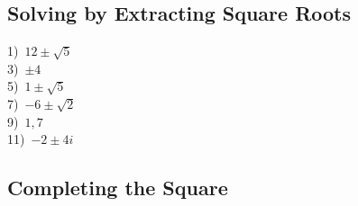 \documentclass[11pt]{book}
\newcommand{\tmstrong}[1]{\textbf{#1}}
\theoremstyle{definition}  %
\begin{document}
\begin{multicols}{2}
\end{multicols}


\subsection*{Solving by Extracting Square Roots}


\begin{multicols}{2}
  1)~$12\pm\sqrt{5}$\\
  3)~$\pm 4$\\
  5)~$1\pm\sqrt{5}$\\
  7)~$-6\pm\sqrt{2}$\\
  9)~$1,7$\\
  11)~$-2\pm 4i$
\end{multicols}


\subsection*{Completing the Square}
\end{document}
